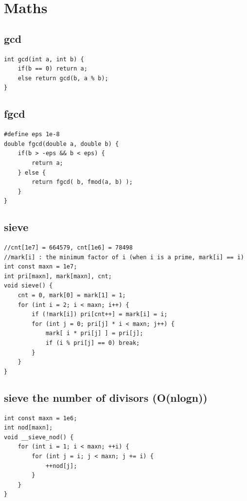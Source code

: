 \documentclass[twocolumn]{article}
\begin{document}
\begin{twocolumn}
\begin{lstlisting}[language={[ANSI]C}]
\end{lstlisting}


\clearpage
\section{Maths}

\subsection{gcd}
\begin{lstlisting}[language={[ANSI]C}]
int gcd(int a, int b) {
	if(b == 0) return a;
	else return gcd(b, a % b);
}
\end{lstlisting}

\subsection{fgcd}

\begin{lstlisting}[language={[ANSI]C}]
#define eps 1e-8
double fgcd(double a, double b) {
	if(b > -eps && b < eps) {
		return a;
	} else {
		return fgcd( b, fmod(a, b) );
	}
}
\end{lstlisting}

\subsection{sieve}
\begin{lstlisting}[language={[ANSI]C}]
//cnt[1e7] = 664579, cnt[1e6] = 78498
//mark[i] : the minimum factor of i (when i is a prime, mark[i] == i)
int const maxn = 1e7;
int pri[maxn], mark[maxn], cnt;
void sieve() {
	cnt = 0, mark[0] = mark[1] = 1;
	for (int i = 2; i < maxn; i++) {
		if (!mark[i]) pri[cnt++] = mark[i] = i;
		for (int j = 0; pri[j] * i < maxn; j++) {
			mark[ i * pri[j] ] = pri[j];
			if (i % pri[j] == 0) break;
		}
	}
}
\end{lstlisting}
\subsection{sieve the number of divisors (O(nlogn))}
\begin{lstlisting}[language={[ANSI]C}]
int const maxn = 1e6;
int nod[maxn];
void __sieve_nod() {
    for (int i = 1; i < maxn; ++i) {
        for (int j = i; j < maxn; j += i) {
            ++nod[j];
        }
    }
}
\end{lstlisting}


\end{twocolumn}
\end{document}
